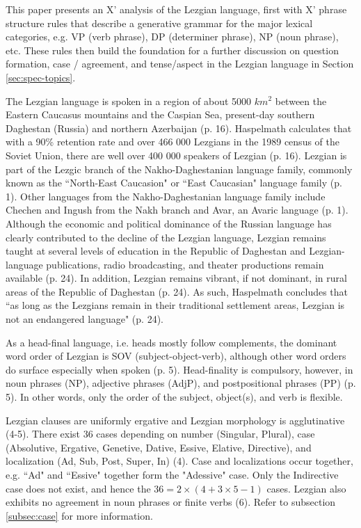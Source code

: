 This paper presents an X' analysis of the Lezgian language, first with X' phrase structure rules that describe a generative grammar for the major lexical categories, e.g. VP (verb phrase), DP (determiner phrase), NP (noun phrase), etc. These rules then build the foundation for a further discussion on question formation, case / agreement, and tense/aspect in the Lezgian language in Section \ref{sec:spec-topics}.

The Lezgian language is spoken in a region of about 5000 $km^2$ between the Eastern Caucasus mountains and the Caspian Sea, present-day southern Daghestan (Russia) and northern Azerbaijan (p. 16). Haspelmath calculates that with a 90\% retention rate and over 466 000 Lezgians in the 1989 census of the Soviet Union, there are well over 400 000 speakers of Lezgian (p. 16). Lezgian is part of the Lezgic branch of the Nakho-Daghestanian language family, commonly known as the ``North-East Caucasion" or ``East Caucasian" language family (p. 1). Other languages from the Nakho-Daghestanian language family include Chechen and Ingush from the Nakh branch and Avar, an Avaric language (p. 1). Although the economic and political dominance of the Russian language has clearly contributed to the decline of the Lezgian language, Lezgian remains taught at several levels of education in the Republic of Daghestan and Lezgian-language publications, radio broadcasting, and theater productions remain available (p. 24). In addition, Lezgian remains vibrant, if not dominant, in rural areas of the Republic of Daghestan (p. 24). As such, Haspelmath concludes that ``as long as the Lezgians remain in their traditional settlement areas, Lezgian is not an endangered language" (p. 24).

As a head-final language, i.e. heads mostly follow complements, the dominant word order of Lezgian is SOV (subject-object-verb), although other word orders do surface especially when spoken (p. 5). Head-finality is compulsory, however, in noun phrases (NP), adjective phrases (AdjP), and postpositional phrases (PP) (p. 5). In other words, only the order of the subject, object(s), and verb is flexible.

Lezgian clauses are uniformly ergative and Lezgian morphology is agglutinative (4-5). There exist 36 cases depending on number (Singular, Plural), case (Absolutive, Ergative, Genetive, Dative, Essive, Elative, Directive), and localization (Ad, Sub, Post, Super, In) (4). Case and localizations occur together, e.g. ``Ad" and ``Essive" together form the "Adessive" case. Only the Indirective case does not exist, and hence the $36=2\times(4+3\times 5 - 1)$ cases. Lezgian also exhibits no agreement in noun phrases or finite verbs (6). Refer to subsection \ref{subsec:case} for more information.